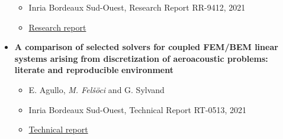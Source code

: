 \documentclass[a4paper, 11pt]{article}
\begin{document}
\begin{itemize}
\begin{itemize}
\item Inria Bordeaux Sud-Ouest, Research Report RR-9412, 2021
\item \begin{center}
\end{center} \href{https://hal.inria.fr/hal-03263603/document}{Research
report}
\end{itemize}
\item \textbf{A comparison of selected solvers for coupled FEM/BEM linear systems arising}
\textbf{from discretization of aeroacoustic problems: literate and reproducible}
\textbf{environment}
\begin{itemize}
\item E. Agullo, \emph{M. Felšöci} and G. Sylvand
\item Inria Bordeaux Sud-Ouest, Technical Report RT-0513, 2021
\item \begin{center}
\end{center} \href{https://hal.inria.fr/hal-03263620/document}{Technical
report}
\end{itemize}
\end{itemize}
\end{document}
